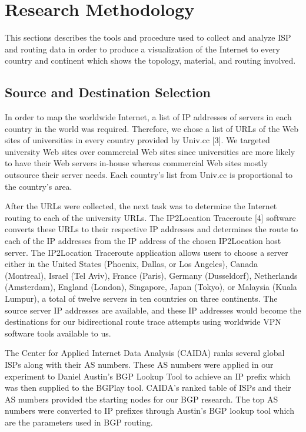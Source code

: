 \documentclass{sigcomm-alternate}
\begin{document}
\section{Research Methodology}
This sections describes the tools and procedure used to collect and analyze ISP and routing data in order to produce a visualization of the Internet to every country and continent which shows the topology, material, and routing involved.

\subsection{Source and Destination Selection}
In order to map the worldwide Internet, a list of IP addresses of servers in each country in the world was required. Therefore, we chose a list of URLs of the Web sites of universities in every country provided by Univ.cc [3]. We targeted university Web sites over commercial Web sites since universities are more likely to have their Web servers in-house whereas commercial Web sites mostly outsource their server needs. Each country’s list from Univ.cc is proportional to the country’s area.

After the URLs were collected, the next task was to determine the Internet routing to each of the university URLs. The IP2Location Traceroute [4] software converts these URLs to their respective IP addresses and determines the route to each of the IP addresses from the IP address of the chosen IP2Location host server. The IP2Location Traceroute application allows users to choose a server either in the United States (Phoenix, Dallas, or Los Angeles), Canada (Montreal), Israel (Tel Aviv), France (Paris), Germany (Dusseldorf), Netherlands (Amsterdam), England (London), Singapore, Japan (Tokyo), or Malaysia (Kuala Lumpur), a total of twelve servers in ten countries on three continents. The source server IP addresses are available, and these IP addresses would become the destinations for our bidirectional route trace attempts using worldwide VPN software tools available to us.

The Center for Applied Internet Data Analysis (CAIDA) ranks several global ISPs along with their AS numbers. These AS numbers were applied in our experiment to Daniel Austin’s BGP Lookup Tool to achieve an IP prefix which was then supplied to the BGPlay tool. CAIDA’s ranked table of ISPs and their AS numbers provided the starting nodes for our BGP research. The top AS numbers were converted to IP prefixes through Austin’s BGP lookup tool which are the parameters used in BGP routing.
\end{document}
